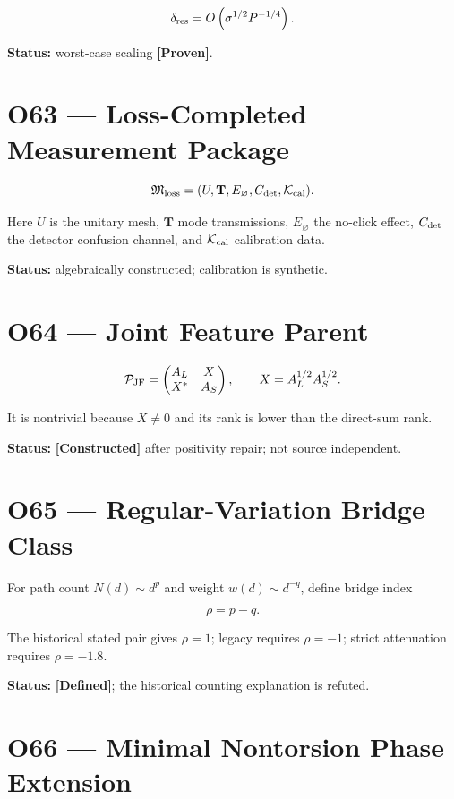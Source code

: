 \documentclass[11pt,a4paper,openany]{report}
\newcommand{\statusProven}{\textcolor{fingreen}{[Proven]}}
\begin{document}
\[
\delta_{\rm res}
=
O\left(
\sigma^{1/2}P^{-1/4}
\right).
\]

\textbf{Status:} worst-case scaling \textbf{\statusProven{}}.

\section{O63 --- Loss-Completed Measurement Package}

\[
\mathfrak M_{\rm loss}
=
(U,\mathbf T,E_{\varnothing},C_{\rm det},
\mathcal K_{\rm cal}).
\]

Here \(U\) is the unitary mesh, \(\mathbf T\) mode transmissions, \(E_{\varnothing}\) the no-click effect, \(C_{\rm det}\) the detector confusion channel, and \(\mathcal K_{\rm cal}\) calibration data.

\textbf{Status:} algebraically constructed; calibration is synthetic.

\section{O64 --- Joint Feature Parent}

\[
\mathcal P_{\rm JF}
=
\begin{pmatrix}
A_L & X\\
X^\ast & A_S
\end{pmatrix},
\qquad
X=A_L^{1/2}A_S^{1/2}.
\]

It is nontrivial because \(X\ne0\) and its rank is lower than the direct-sum rank.

\textbf{Status:} \textbf{[Constructed]} after positivity repair; not source independent.

\section{O65 --- Regular-Variation Bridge Class}

For path count \(N(d)\sim d^p\) and weight \(w(d)\sim d^{-q}\), define bridge index

\[
\rho=p-q.
\]

The historical stated pair gives \(\rho=1\); legacy requires \(\rho=-1\); strict attenuation requires \(\rho=-1.8\).

\textbf{Status:} \textbf{[Defined]}; the historical counting explanation is refuted.

\section{O66 --- Minimal Nontorsion Phase Extension}
\end{document}
